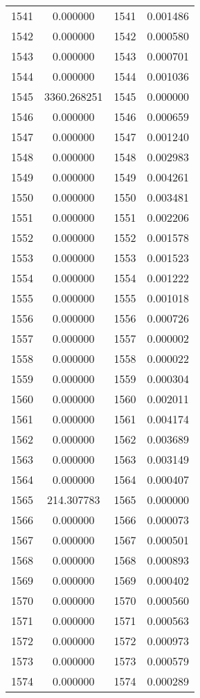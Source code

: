 \documentclass[12pt]{article}
\begin{document}
\begin{longtable}{@{}cccc@{}}
1541 & 0.000000 & 1541 & 0.001486 \\
1542 & 0.000000 & 1542 & 0.000580 \\
1543 & 0.000000 & 1543 & 0.000701 \\
1544 & 0.000000 & 1544 & 0.001036 \\
1545 & 3360.268251 & 1545 & 0.000000 \\
1546 & 0.000000 & 1546 & 0.000659 \\
1547 & 0.000000 & 1547 & 0.001240 \\
1548 & 0.000000 & 1548 & 0.002983 \\
1549 & 0.000000 & 1549 & 0.004261 \\
1550 & 0.000000 & 1550 & 0.003481 \\
1551 & 0.000000 & 1551 & 0.002206 \\
1552 & 0.000000 & 1552 & 0.001578 \\
1553 & 0.000000 & 1553 & 0.001523 \\
1554 & 0.000000 & 1554 & 0.001222 \\
1555 & 0.000000 & 1555 & 0.001018 \\
1556 & 0.000000 & 1556 & 0.000726 \\
1557 & 0.000000 & 1557 & 0.000002 \\
1558 & 0.000000 & 1558 & 0.000022 \\
1559 & 0.000000 & 1559 & 0.000304 \\
1560 & 0.000000 & 1560 & 0.002011 \\
1561 & 0.000000 & 1561 & 0.004174 \\
1562 & 0.000000 & 1562 & 0.003689 \\
1563 & 0.000000 & 1563 & 0.003149 \\
1564 & 0.000000 & 1564 & 0.000407 \\
1565 & 214.307783 & 1565 & 0.000000 \\
1566 & 0.000000 & 1566 & 0.000073 \\
1567 & 0.000000 & 1567 & 0.000501 \\
1568 & 0.000000 & 1568 & 0.000893 \\
1569 & 0.000000 & 1569 & 0.000402 \\
1570 & 0.000000 & 1570 & 0.000560 \\
1571 & 0.000000 & 1571 & 0.000563 \\
1572 & 0.000000 & 1572 & 0.000973 \\
1573 & 0.000000 & 1573 & 0.000579 \\
1574 & 0.000000 & 1574 & 0.000289 \\

\end{longtable}
\end{document}
